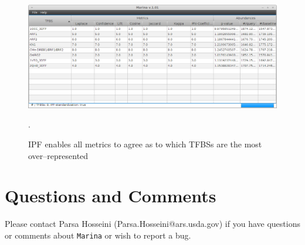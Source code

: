 \documentclass{article}
\begin{document}
\begin{figure}[htbc]
	\centering
	\includegraphics[scale=0.42]{./images/marina_withipf.png}
	\caption{IPF enables all metrics to agree as to which TFBSs are the 
		most over--represented}.
	\label{fig:marina_withipf}
\end{figure}

\section{Questions and Comments}
Please contact Parsa Hosseini (Parsa.Hosseini@ars.usda.gov) if you have
questions or comments about \texttt{Marina} or wish to report a bug.

\clearpage
\renewcommand{\refname}{Useful Resources \& Reading}


\end{document}
